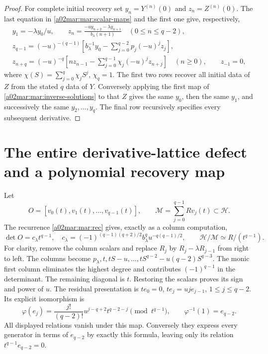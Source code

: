 \documentclass[11pt,a4paper]{article}
\begin{document}
\begin{proof}
For complete initial recovery set $y_n=Y^{(n)}(0)$ and
$z_n=Z^{(n)}(0)$. The last equation in \eqref{a02mar:mar:scalar-maps}
and the first one give, respectively,
\begin{equation}\tag{MAR9}\label{a02mar:mar:initial}
 \begin{gathered}
 y_1=-\lambda y_0/u,\qquad
 z_n=\frac{-u y_{n+2}-\lambda y_{n+1}}{b_\lambda(n+1)}
             \quad(0\le n\le q-2),\\
 z_{q-1}=(-u)^{-(q-1)}
 \left[b_\lambda^{-1}y_0-
             \sum_{j=0}^{q-2}p_j(-u)^jz_j\right],\\
 z_{n+q}=(-u)^{-q}
 \left[nz_{n-1}-\sum_{j=0}^{q-1}\chi_j(-u)^jz_{n+j}\right]
          \quad(n\ge0),\qquad z_{-1}=0,
 \end{gathered}
\end{equation}
where $\chi(S)=\sum_{j=0}^q\chi_jS^j$, $\chi_q=1$.
The first two rows recover all initial data of $Z$ from the stated
$q$ data of $Y$. Conversely applying the first map of
\eqref{a02mar:mar:inverse-solutions} to that $Z$ gives the same $y_0$,
then the same $y_1$, and successively the same $y_2,\ldots,y_q$.
The final row recursively specifies every subsequent derivative.
\end{proof}

\section{The entire derivative-lattice defect and a polynomial recovery map}
Let
\[
 O=[v_0(t),v_1(t),\ldots,v_{q-1}(t)],\qquad
 \mathscr M=\sum_{j=0}^{q-1}Rv_j(t)\subset\mathscr H.
\]
The recurrence \eqref{a02mar:mar:rec} gives, exactly as a column computation,
\begin{equation}\tag{MAR10}\label{a02mar:mar:lattice}
 \det O=c_\lambda t^{q-1},\quad
 c_\lambda=(-1)^{(q-1)(q+2)/2}b_\lambda^q u^{-q(q-1)/2},
 \qquad\mathscr H/\mathscr M\simeq R/(t^{q-1}).
\end{equation}
For clarity, remove the column scalars and replace $R_j$ by
$R_j-\lambda R_{j-1}$ from right to left. The columns become
$p_\lambda,t,tS-u,\ldots,tS^{q-2}-u(q-2)S^{q-3}$.
The monic first column eliminates the highest degree and contributes
$(-1)^{q-1}$ in the determinant. The remaining diagonal is $t$.
Restoring the scalars proves its sign and power of $u$.
The residual presentation is
$te_0=0$, $te_j=uj e_{j-1}$, $1\le j\le q-2$.
Its explicit isomorphism is
\begin{equation}\tag{MAR11}\label{a02mar:mar:phi}
 \varphi(e_j)=\frac{j!}{(q-2)!}u^{j-q+2}t^{q-2-j}\pmod{t^{q-1}},
 \qquad\varphi^{-1}(1)=e_{q-2}.
\end{equation}
All displayed relations vanish under this map. Conversely they express
every generator in terms of $e_{q-2}$ by exactly this formula, leaving
only its relation $t^{q-1}e_{q-2}=0$.
\end{document}
